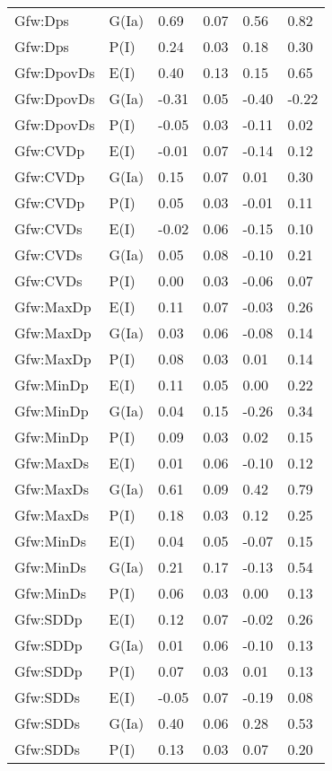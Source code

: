 \begin{center}
\begin{longtable}{|p{1.1in}|p{0.7in}|p{0.7in}|p{0.6in}|p{0.6in}|p{0.6in}|}
  Gfw:Dps & G(Ia) & 0.69 & 0.07 & 0.56 & 0.82 \\ 
  Gfw:Dps & P(I) & 0.24 & 0.03 & 0.18 & 0.30 \\ 
  Gfw:DpovDs & E(I) & 0.40 & 0.13 & 0.15 & 0.65 \\ 
  Gfw:DpovDs & G(Ia) & -0.31 & 0.05 & -0.40 & -0.22 \\ 
  Gfw:DpovDs & P(I) & -0.05 & 0.03 & -0.11 & 0.02 \\ 
  Gfw:CVDp & E(I) & -0.01 & 0.07 & -0.14 & 0.12 \\ 
  Gfw:CVDp & G(Ia) & 0.15 & 0.07 & 0.01 & 0.30 \\ 
  Gfw:CVDp & P(I) & 0.05 & 0.03 & -0.01 & 0.11 \\ 
  Gfw:CVDs & E(I) & -0.02 & 0.06 & -0.15 & 0.10 \\ 
  Gfw:CVDs & G(Ia) & 0.05 & 0.08 & -0.10 & 0.21 \\ 
  Gfw:CVDs & P(I) & 0.00 & 0.03 & -0.06 & 0.07 \\ 
  Gfw:MaxDp & E(I) & 0.11 & 0.07 & -0.03 & 0.26 \\ 
  Gfw:MaxDp & G(Ia) & 0.03 & 0.06 & -0.08 & 0.14 \\ 
  Gfw:MaxDp & P(I) & 0.08 & 0.03 & 0.01 & 0.14 \\ 
  Gfw:MinDp & E(I) & 0.11 & 0.05 & 0.00 & 0.22 \\ 
  Gfw:MinDp & G(Ia) & 0.04 & 0.15 & -0.26 & 0.34 \\ 
  Gfw:MinDp & P(I) & 0.09 & 0.03 & 0.02 & 0.15 \\ 
  Gfw:MaxDs & E(I) & 0.01 & 0.06 & -0.10 & 0.12 \\ 
  Gfw:MaxDs & G(Ia) & 0.61 & 0.09 & 0.42 & 0.79 \\ 
  Gfw:MaxDs & P(I) & 0.18 & 0.03 & 0.12 & 0.25 \\ 
  Gfw:MinDs & E(I) & 0.04 & 0.05 & -0.07 & 0.15 \\ 
  Gfw:MinDs & G(Ia) & 0.21 & 0.17 & -0.13 & 0.54 \\ 
  Gfw:MinDs & P(I) & 0.06 & 0.03 & 0.00 & 0.13 \\ 
  Gfw:SDDp & E(I) & 0.12 & 0.07 & -0.02 & 0.26 \\ 
  Gfw:SDDp & G(Ia) & 0.01 & 0.06 & -0.10 & 0.13 \\ 
  Gfw:SDDp & P(I) & 0.07 & 0.03 & 0.01 & 0.13 \\ 
  Gfw:SDDs & E(I) & -0.05 & 0.07 & -0.19 & 0.08 \\ 
  Gfw:SDDs & G(Ia) & 0.40 & 0.06 & 0.28 & 0.53 \\ 
  Gfw:SDDs & P(I) & 0.13 & 0.03 & 0.07 & 0.20 \\ 

\end{longtable}
\end{center}
